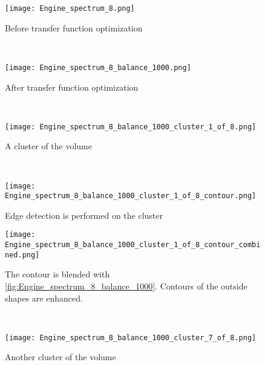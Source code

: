 \begin{figure}
	\centering
	\begin{minipage}{.24\textwidth}
		\centering
		\texttt{[image: Engine\_spectrum\_8.png]}
		\caption{Before transfer function optimization}
		\label{fig:Engine_spectrum_8}
	\end{minipage}~
	\begin{minipage}{.24\textwidth}
		\centering
		\texttt{[image: Engine\_spectrum\_8\_balance\_1000.png]}
		\caption{After transfer function optimization}
		\label{fig:Engine_spectrum_8_balance_1000}
	\end{minipage}~
	\begin{minipage}{.24\textwidth}
		\centering
		\texttt{[image: Engine\_spectrum\_8\_balance\_1000\_cluster\_1\_of\_8.png]}
		\caption{A cluster of the volume}
		\label{fig:Engine_spectrum_8_balance_1000_cluster_1_of_8}
	\end{minipage}~
	\begin{minipage}{.24\textwidth}
		\centering
		\texttt{[image: Engine\_spectrum\_8\_balance\_1000\_cluster\_1\_of\_8\_contour.png]}
		\caption{Edge detection is performed on the cluster}
		\label{fig:Engine_spectrum_8_balance_1000_cluster_1_of_8_contour}
	\end{minipage}
	\begin{minipage}{.24\textwidth}
		\centering
		\texttt{[image: Engine\_spectrum\_8\_balance\_1000\_cluster\_1\_of\_8\_contour\_combined.png]}
		\caption{The contour is blended with \ref{fig:Engine_spectrum_8_balance_1000}. Contours of the outside shapes are enhanced.}
		\label{fig:Engine_spectrum_8_balance_1000_cluster_1_of_8_contour_combined}
	\end{minipage}~
	\begin{minipage}{.24\textwidth}
		\centering
		\texttt{[image: Engine\_spectrum\_8\_balance\_1000\_cluster\_7\_of\_8.png]}
		\caption{Another cluster of the volume}

\end{minipage}
\end{figure}
